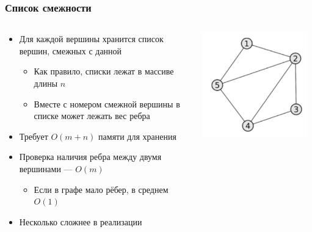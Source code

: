 \documentclass{../../slides-style}
\begin{document}
    \begin{frame}
        \frametitle{Список смежности}
        \begin{columns}
            \begin{column}{0.65\textwidth}
                \begin{itemize}
                    \item Для каждой вершины хранится список вершин, смежных с данной
                    \begin{itemize}
                        \item Как правило, списки лежат в массиве длины $n$
                        \item Вместе с номером смежной вершины в списке может лежать вес ребра
                    \end{itemize}
                    \item Требует $O(m + n)$ памяти для хранения
                    \item Проверка наличия ребра между двумя вершинами --- $O(m)$
                    \begin{itemize}
                        \item Если в графе мало рёбер, в среднем $O(1)$
                    \end{itemize}
                    \item Несколько сложнее в реализации
                \end{itemize}
            \end{column}
            \begin{column}{0.35\textwidth}
                \begin{center}
                    \includegraphics[width=0.95\textwidth]{adjacency-list.png}

\end{center}
\end{column}
\end{columns}
\end{frame}
\end{document}
